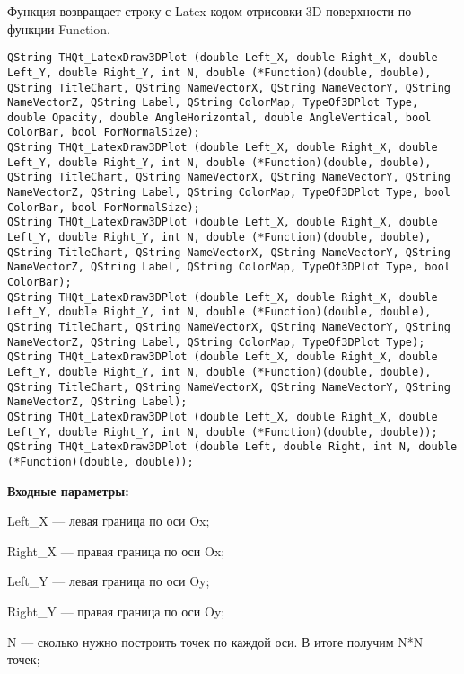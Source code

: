 \documentclass[a4paper,12pt]{article}
\begin{document}
Функция возвращает строку с Latex кодом отрисовки 3D поверхности по функции Function.


\begin{lstlisting}[label=code_syntax_THQt_LatexDraw3DPlot,caption=Синтаксис]
QString THQt_LatexDraw3DPlot (double Left_X, double Right_X, double Left_Y, double Right_Y, int N, double (*Function)(double, double),  QString TitleChart, QString NameVectorX, QString NameVectorY, QString NameVectorZ, QString Label, QString ColorMap, TypeOf3DPlot Type, double Opacity, double AngleHorizontal, double AngleVertical, bool ColorBar, bool ForNormalSize);
QString THQt_LatexDraw3DPlot (double Left_X, double Right_X, double Left_Y, double Right_Y, int N, double (*Function)(double, double),  QString TitleChart, QString NameVectorX, QString NameVectorY, QString NameVectorZ, QString Label, QString ColorMap, TypeOf3DPlot Type, bool ColorBar, bool ForNormalSize);
QString THQt_LatexDraw3DPlot (double Left_X, double Right_X, double Left_Y, double Right_Y, int N, double (*Function)(double, double),  QString TitleChart, QString NameVectorX, QString NameVectorY, QString NameVectorZ, QString Label, QString ColorMap, TypeOf3DPlot Type, bool ColorBar);
QString THQt_LatexDraw3DPlot (double Left_X, double Right_X, double Left_Y, double Right_Y, int N, double (*Function)(double, double),  QString TitleChart, QString NameVectorX, QString NameVectorY, QString NameVectorZ, QString Label, QString ColorMap, TypeOf3DPlot Type);
QString THQt_LatexDraw3DPlot (double Left_X, double Right_X, double Left_Y, double Right_Y, int N, double (*Function)(double, double),  QString TitleChart, QString NameVectorX, QString NameVectorY, QString NameVectorZ, QString Label);
QString THQt_LatexDraw3DPlot (double Left_X, double Right_X, double Left_Y, double Right_Y, int N, double (*Function)(double, double));
QString THQt_LatexDraw3DPlot (double Left, double Right, int N, double (*Function)(double, double));

\end{lstlisting}

\textbf{Входные параметры:}

Left\_X --- левая граница по оси Ox;
 
    Right\_X --- правая граница по оси Ox;
 
    Left\_Y --- левая граница по оси Oy;
 
    Right\_Y --- правая граница по оси Oy;
 
    N --- сколько нужно построить точек по каждой оси. В итоге получим N*N точек;
 
\end{document}
